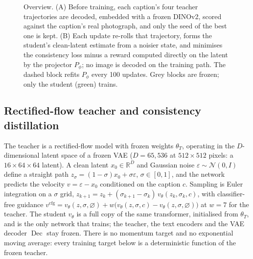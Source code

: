 \documentclass{article} %
\DeclareMathOperator{\Dec}{Dec}
\DeclareMathOperator{\sgop}{sg}
\begin{document}
\begin{figure}[!htb]
{}
\caption{Overview. (A) Before training, each caption's four teacher trajectories are decoded, embedded with a
frozen DINOv2, scored against the caption's real photograph, and only the seed of the best one is kept.
(B) Each update re-rolls that trajectory, forms the student's clean-latent estimate from a noisier state,
and minimises the consistency loss minus a reward computed directly on the latent by the projector
$P_\phi$; no image is decoded on the training path. The dashed block refits $P_\phi$ every 100 updates.
Grey blocks are frozen; only the student (green) trains.}
\label{fig:overview}
\end{figure}

\subsection{Rectified-flow teacher and consistency distillation}
\label{sec:prelim}
The teacher is a rectified-flow model with frozen weights $\theta_T$, operating in the $D$-dimensional
latent space of a frozen VAE ($D{=}65{,}536$ at $512{\times}512$ pixels: a $16{\times}64{\times}64$
latent). A clean latent $x_0\in\mathbb R^D$ and Gaussian noise $\varepsilon\sim\mathcal N(0,I)$ define a
straight path $z_\sigma=(1-\sigma)x_0+\sigma\varepsilon$, $\sigma\in[0,1]$, and the network predicts the
velocity $v=\varepsilon-x_0$ conditioned on the caption $c$. Sampling is Euler integration on a $\sigma$
grid, $z_{k+1}=z_k+(\sigma_{k+1}-\sigma_k)\,v_\theta(z_k,\sigma_k,c)$, with classifier-free guidance
$v^{\mathrm{cfg}}=v_\theta(z,\sigma,\varnothing)+w\big(v_\theta(z,\sigma,c)-v_\theta(z,\sigma,\varnothing)\big)$
at $w=7$ for the teacher. The student $v_\theta$ is a full copy of the same transformer, initialised from
$\theta_T$, and is the only network that trains; the teacher, the text encoders and the VAE decoder
$\Dec$ stay frozen. There is no momentum target and no exponential moving average: every training
target below is a deterministic function of the frozen teacher.
\end{document}
